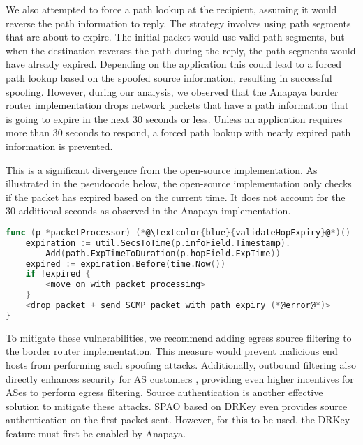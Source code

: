 We also attempted to force a path lookup at the recipient, assuming it would reverse the path information to reply.
The strategy involves using path segments that are about to expire.
The initial packet would use valid path segments, but when the destination reverses the path during the reply, the path segments would have already expired.
Depending on the application this could lead to a forced path lookup based on the spoofed source information, resulting in successful spoofing.
However, during our analysis, we observed that the Anapaya border router implementation drops network packets that have a path information that is going to expire in the next 30 seconds or less.
Unless an application requires more than 30 seconds to respond, a forced path lookup with nearly expired path information is prevented.

This is a significant divergence from the open-source implementation.
As illustrated in the pseudocode below, the open-source implementation only checks if the packet has expired based on the current time.
It does not account for the 30 additional seconds as observed in the Anapaya implementation.


\begin{lstlisting}[language={Go}, morekeywords={}, caption={Pseudocode of hop expiry check in open-source implementation of the border router.}, label={lst:hop-expiry}]
func (p *packetProcessor) (*@\textcolor{blue}{validateHopExpiry}@*)() (processResult, error) {
    expiration := util.SecsToTime(p.infoField.Timestamp).
        Add(path.ExpTimeToDuration(p.hopField.ExpTime))
    expired := expiration.Before(time.Now())
    if !expired {
        <move on with packet processing>
    }
    <drop packet + send SCMP packet with path expiry (*@error@*)>
}
\end{lstlisting}


To mitigate these vulnerabilities, we recommend adding egress source filtering to the border router implementation.
This measure would prevent malicious end hosts from performing such spoofing attacks.
Additionally, outbound filtering also directly enhances security for AS customers \cite[Section 7.7.3]{Perrig2022}, providing even higher incentives for ASes to perform egress filtering.
Source authentication is another effective solution to mitigate these attacks.
SPAO based on DRKey even provides source authentication on the first packet sent.
However, for this to be used, the DRKey feature must first be enabled by Anapaya.




